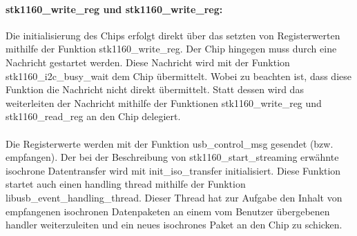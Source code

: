 \paragraph{stk1160\_write\_reg und stk1160\_write\_reg:}
Die initialisierung des \stk{} Chips erfolgt direkt über das setzten von Registerwerten mithilfe der Funktion stk1160\_write\_reg. Der \saa{} Chip hingegen muss durch eine \iic Nachricht gestartet werden. Diese Nachricht wird mit der Funktion stk1160\_i2c\_busy\_wait dem \saa{} Chip übermittelt. Wobei zu beachten ist, dass diese Funktion die Nachricht nicht direkt übermittelt. Statt dessen wird das weiterleiten der Nachricht mithilfe der Funktionen stk1160\_write\_reg und stk1160\_read\_reg an den \stk{} Chip delegiert. 

\paragraph{}
Die Registerwerte werden mit der Funktion usb\_control\_msg gesendet (bzw. empfangen). Der bei der Beschreibung von stk1160\_start\_streaming erwähnte isochrone Datentransfer wird mit init\_iso\_transfer initialisiert. Diese Funktion startet auch einen handling thread mithilfe der Funktion libusb\_event\_handling\_thread. Dieser Thread hat zur Aufgabe den Inhalt von empfangenen isochronen Datenpaketen an einem vom Benutzer übergebenen handler weiterzuleiten und ein neues isochrones Paket an den \stk{} Chip zu schicken. 

